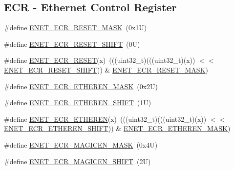 \subsection*{E\+CR -\/ Ethernet Control Register}
\begin{DoxyCompactItemize}
\item 
\#define \mbox{\hyperlink{group___e_n_e_t___register___masks_ga3b154308b2f4ab59eb5e0bed4f38cb70}{E\+N\+E\+T\+\_\+\+E\+C\+R\+\_\+\+R\+E\+S\+E\+T\+\_\+\+M\+A\+SK}}~(0x1\+U)
\item 
\#define \mbox{\hyperlink{group___e_n_e_t___register___masks_ga717ccaad52747f6a8be4eae66d95d178}{E\+N\+E\+T\+\_\+\+E\+C\+R\+\_\+\+R\+E\+S\+E\+T\+\_\+\+S\+H\+I\+FT}}~(0\+U)
\item 
\#define \mbox{\hyperlink{group___e_n_e_t___register___masks_ga34354f83348e2acca4a015477d740cc3}{E\+N\+E\+T\+\_\+\+E\+C\+R\+\_\+\+R\+E\+S\+ET}}(x)~(((uint32\+\_\+t)(((uint32\+\_\+t)(x)) $<$$<$ \mbox{\hyperlink{group___e_n_e_t___register___masks_ga717ccaad52747f6a8be4eae66d95d178}{E\+N\+E\+T\+\_\+\+E\+C\+R\+\_\+\+R\+E\+S\+E\+T\+\_\+\+S\+H\+I\+FT}})) \& \mbox{\hyperlink{group___e_n_e_t___register___masks_ga3b154308b2f4ab59eb5e0bed4f38cb70}{E\+N\+E\+T\+\_\+\+E\+C\+R\+\_\+\+R\+E\+S\+E\+T\+\_\+\+M\+A\+SK}})
\item 
\#define \mbox{\hyperlink{group___e_n_e_t___register___masks_ga126db2064186c551ab345ff5331b943b}{E\+N\+E\+T\+\_\+\+E\+C\+R\+\_\+\+E\+T\+H\+E\+R\+E\+N\+\_\+\+M\+A\+SK}}~(0x2\+U)
\item 
\#define \mbox{\hyperlink{group___e_n_e_t___register___masks_ga789e6666f8a77f5f64c74bbf4bd52767}{E\+N\+E\+T\+\_\+\+E\+C\+R\+\_\+\+E\+T\+H\+E\+R\+E\+N\+\_\+\+S\+H\+I\+FT}}~(1\+U)
\item 
\#define \mbox{\hyperlink{group___e_n_e_t___register___masks_ga16c3be23b326a42cf48cbd3801834321}{E\+N\+E\+T\+\_\+\+E\+C\+R\+\_\+\+E\+T\+H\+E\+R\+EN}}(x)~(((uint32\+\_\+t)(((uint32\+\_\+t)(x)) $<$$<$ \mbox{\hyperlink{group___e_n_e_t___register___masks_ga789e6666f8a77f5f64c74bbf4bd52767}{E\+N\+E\+T\+\_\+\+E\+C\+R\+\_\+\+E\+T\+H\+E\+R\+E\+N\+\_\+\+S\+H\+I\+FT}})) \& \mbox{\hyperlink{group___e_n_e_t___register___masks_ga126db2064186c551ab345ff5331b943b}{E\+N\+E\+T\+\_\+\+E\+C\+R\+\_\+\+E\+T\+H\+E\+R\+E\+N\+\_\+\+M\+A\+SK}})
\item 
\#define \mbox{\hyperlink{group___e_n_e_t___register___masks_gac9f26b8af41cbdc78fce749af85c7c31}{E\+N\+E\+T\+\_\+\+E\+C\+R\+\_\+\+M\+A\+G\+I\+C\+E\+N\+\_\+\+M\+A\+SK}}~(0x4\+U)
\item 
\#define \mbox{\hyperlink{group___e_n_e_t___register___masks_ga67e75bc314dd2ad2b5c2c5367bde4a2b}{E\+N\+E\+T\+\_\+\+E\+C\+R\+\_\+\+M\+A\+G\+I\+C\+E\+N\+\_\+\+S\+H\+I\+FT}}~(2\+U)

\end{DoxyCompactItemize}

